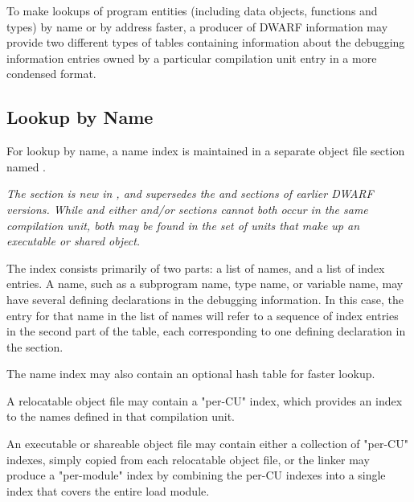 To make lookups of program entities (including data objects, 
functions and types) by name or by address faster, a producer 
of DWARF information may provide two different types of tables
containing information about the debugging information
entries owned by a particular compilation unit entry in a
more condensed format.

\subsection{Lookup by Name}
For lookup by name, a name index is maintained in a separate
object file section named \dotdebugnames{}. 

\textit{The \dotdebugnames{} section is new in \DWARFVersionV,
and supersedes the \dotdebugpubnames{} and \dotdebugpubtypes{}
sections of earlier DWARF versions. While \dotdebugnames{} and
either \dotdebugpubnames{} and/or \dotdebugpubtypes{} sections
cannot both occur in the same compilation unit, both may be
found in the set of units that make up an executable or shared
object.}

The index consists
primarily of two parts: a list of names, and a list of index
entries. A name, such as a subprogram name, type name, or
variable name, may have several defining declarations in the
debugging information. In this case, the entry for that name in
the list of names will refer to a sequence of index entries in
the second part of the table, each corresponding to one defining
declaration in the \dotdebuginfo{} section.

The name index may also contain an optional hash table for faster
lookup.

A relocatable object file may contain a "per-CU" index, which
provides an index to the names defined in that compilation
unit.

An executable or shareable object file may contain either a collection of
"per-CU" indexes, simply copied from each relocatable object
file, or the linker may produce a "per-module" index by
combining the per-CU indexes into a single index that covers
the entire load module.

